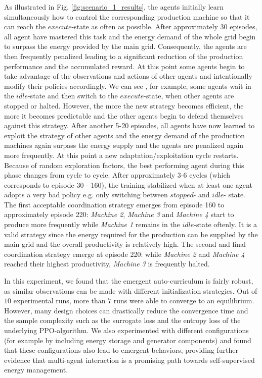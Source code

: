 As illustrated in Fig. \ref{fig:scenario_1_results}, the agents initially learn simultaneously how to control the corresponding production machine so that it can reach the $execute$-state as often as possible. After approximately 30 episodes, all agent have mastered this task and the energy demand of the whole grid begin to surpass the energy provided by the main grid. Consequently, the agents are then frequently penalized leading to a significant reduction of the production performance and the accumulated reward. At this point some agents begin to take advantage of the observations and actions of other agents and intentionally modify their policies accordingly. We can see , for example, some agents wait in the $idle$-state and then switch to the $execute$-state, when other agents are stopped or halted. However, the more the new strategy becomes efficient, the more it becomes predictable and the other agents begin to defend themselves against this strategy. After another 5-20 episodes, all agents have now learned to exploit the strategy of other agents and the energy demand of the production machines again surpass the energy supply and the agents are penalized again more frequently. At this point a new adaptation/exploitation cycle restarts. Because of random exploration factors, the best performing agent during this phase changes from cycle to cycle. After approximately 3-6 cycles (which corresponds to episode 30 - 160), the training stabilized when at least one agent adopts a very bad policy e.g. only switching between $stopped$- and $idle$- state. The first acceptable coordination strategy emerges from episode 160 to approximately episode 220: \textit{Machine 2}, \textit{Machine 3} and \textit{Machine 4} start to produce more frequently while \textit{Machine 1} remains in the $idle$-state oftenly. It is a valid strategy since the energy required for the production can be supplied by the main grid and the overall productivity is  relatively high. The second and final coordination strategy emerge at episode 220: while \textit{Machine 2} and \textit{Machine 4} reached their highest productivity,  \textit{Machine 3} is frequently halted.

In this experiment, we found that the emergent auto-curriculum is fairly robust, as similar observations can be made with different initialization strategies. Out of $10$ experimental runs, more than $7$ runs were able to converge to an equilibrium. However, many design choices can drastically reduce the convergence time and the sample complexity such as the surrogate loss and the entropy loss of the underlying PPO-algorithm. We also experimented with different configurations (for example by including energy storage and generator components) and found that these configurations also lead to emergent behaviors, providing further evidence that multi-agent interaction is a promising path towards self-supervised energy management.

